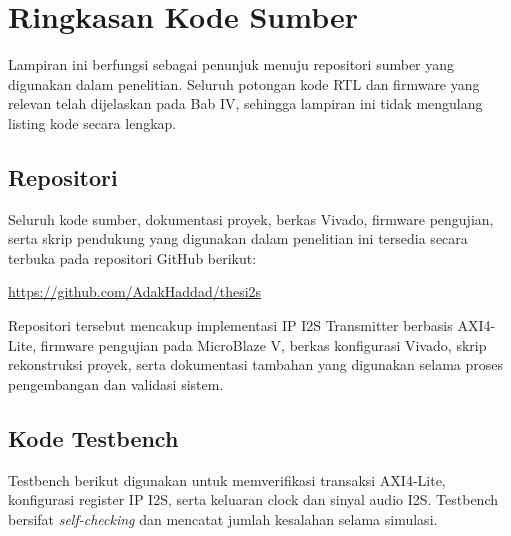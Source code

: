 \chapter{Ringkasan Kode Sumber}


Lampiran ini berfungsi sebagai penunjuk menuju repositori sumber yang digunakan dalam penelitian. Seluruh potongan kode RTL dan firmware yang relevan telah dijelaskan pada Bab IV, sehingga lampiran ini tidak mengulang listing kode secara lengkap.

\section{Repositori}

Seluruh kode sumber, dokumentasi proyek, berkas Vivado, firmware pengujian, serta skrip pendukung yang digunakan dalam penelitian ini tersedia secara terbuka pada repositori GitHub berikut:

\begin{center}
\url{https://github.com/AdakHaddad/thesi2s}
\end{center}

Repositori tersebut mencakup implementasi IP I2S Transmitter berbasis AXI4-Lite, firmware pengujian pada MicroBlaze V, berkas konfigurasi Vivado, skrip rekonstruksi proyek, serta dokumentasi tambahan yang digunakan selama proses pengembangan dan validasi sistem.

\section{Kode Testbench}

Testbench berikut digunakan untuk memverifikasi transaksi AXI4-Lite, konfigurasi
register IP I2S, serta keluaran clock dan sinyal audio I2S. Testbench bersifat
\textit{self-checking} dan mencatat jumlah kesalahan selama simulasi.



